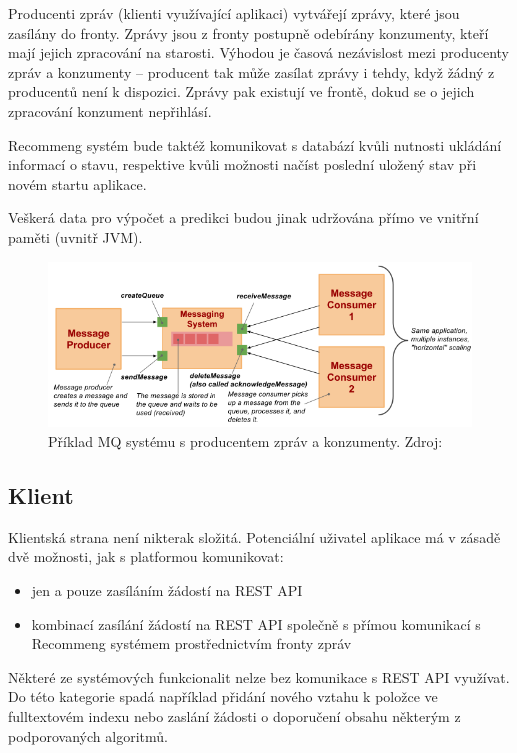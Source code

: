 \documentclass[thesis=M,czech]{FITthesis}[2014/05/07]
\begin{document}
Producenti zpráv (klienti využívající aplikaci) vytvářejí zprávy, které jsou zasílány do fronty. Zprávy jsou z fronty postupně odebírány konzumenty, kteří mají jejich zpracování na starosti. Výhodou je časová nezávislost mezi producenty zpráv a konzumenty – producent tak může zasílat zprávy i tehdy, když žádný z producentů není k dispozici. Zprávy pak existují ve frontě, dokud se o jejich zpracování konzument nepřihlásí.

Recommeng systém bude taktéž komunikovat s databází kvůli nutnosti ukládání informací o stavu, respektive kvůli možnosti načíst poslední uložený stav při novém startu aplikace.

Veškerá data pro výpočet a predikci budou jinak udržována přímo ve vnitřní paměti (uvnitř JVM). 

\begin{figure}\centering
	\includegraphics[width=1.2\textwidth]{obr/vitvar_mq.png}
 	\caption[Příklad MQ systému s producentem zpráv a konzumenty]{Příklad MQ systému s producentem zpráv a konzumenty. Zdroj: \cite{vitvarMq}}\label{fig:vitvarMq}
\end{figure}	

\subsection{Klient}

Klientská strana není nikterak složitá. Potenciální uživatel aplikace má v zásadě dvě možnosti, jak s platformou komunikovat:

\begin{itemize}
	\item jen a pouze zasíláním žádostí na REST API
	\item kombinací zasílání žádostí na REST API společně s přímou komunikací s Recommeng systémem prostřednictvím fronty zpráv
\end{itemize}

Některé ze systémových funkcionalit nelze bez komunikace s REST API využívat. Do této kategorie spadá například přidání nového vztahu k položce ve fulltextovém indexu nebo zaslání žádosti o doporučení obsahu některým z podporovaných algoritmů. 
\end{document}
